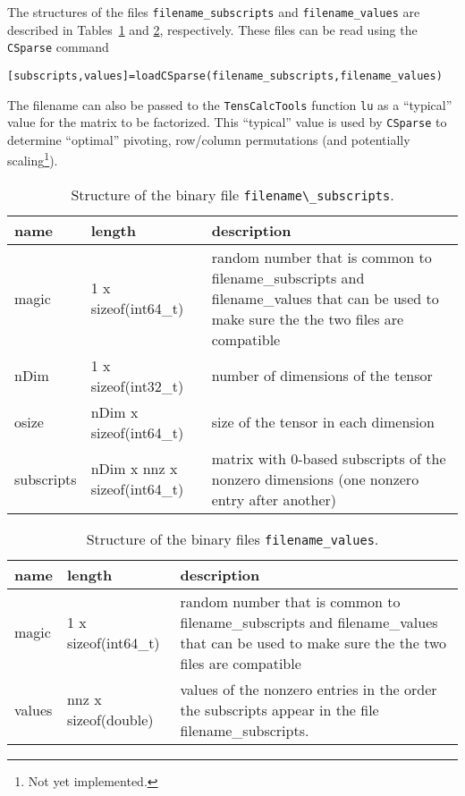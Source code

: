 \documentclass[11pt]{article}
\newcommand{\TC}{\texttt{TensCalcTools}}
\newcommand{\CS}{\texttt{CSparse}}
\begin{document}
The structures of the files \lstinline{filename_subscripts} and
\lstinline{filename_values} are described in
Tables~\ref{tab:subscripts-file} and \ref{tab:values-file},
respectively. These files can be read using the \CS{} command
\begin{lstlisting}
[subscripts,values]=loadCSparse(filename_subscripts,filename_values)
\end{lstlisting}
The filename can also be passed to the \TC{} function \lstinline{lu}
as a ``typical'' value for the matrix to be factorized. This
``typical'' value is used by \CS{} to determine ``optimal'' pivoting,
row/column permutations (and potentially scaling\footnote{Not yet
  implemented.}).

\begin{table}[h]
  \centering
  \caption{Structure of the binary file \lstinline{filename\_subscripts}.}
  \begin{tabular}{p{}p{}p{}}
    \hline
    name  & length & description\\\hline
    magic & {1 x sizeof(int64\_t)} & random number that is common to
    {filename\_subscripts} and {filename\_values}
    that can be used to make sure the the two files are compatible\\
    nDim  & {1 x sizeof(int32\_t)} & number of dimensions of the tensor\\
    osize & {nDim x sizeof(int64\_t)} & size of the tensor in each dimension\\
    subscripts & {nDim x nnz x sizeof(int64\_t)} & matrix with 0-based
    subscripts of the nonzero dimensions (one nonzero entry after another)\\\hline
  \end{tabular}
  \label{tab:subscripts-file}
\end{table}

\begin{table}[h]
  \centering
  \caption{Structure of the binary files \lstinline{filename_values}.}
  \begin{tabular}{p{}p{}p{}}
    \hline
    name  & length & description\\\hline
    magic & {1 x sizeof(int64\_t)} & random number that is common to
    {filename\_subscripts} and {filename\_values}
    that can be used to make sure the the two files are compatible\\
    values & {nnz x sizeof(double)} & values of the nonzero entries in
    the order the subscripts appear in the file {filename\_subscripts}.\\\hline
  \end{tabular}
  \label{tab:values-file}
\end{table}
\end{document}
